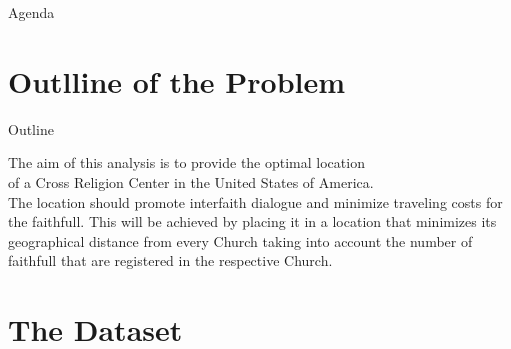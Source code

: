 \documentclass[12pt]{beamer}
\begin{document}
{
}
\begin{frame}{Agenda}
\tableofcontents
\end{frame}

\section{Outlline of the Problem}

\begin{frame}{Outline}

The aim of this analysis is to provide the optimal location \\
of a Cross Religion Center in the United States of America. \\
The location should promote interfaith dialogue and minimize traveling costs for the faithfull. 
This will be achieved by placing it in a location that minimizes its geographical distance from every Church taking into account the number of faithfull that are registered in the respective Church.



\end{frame}



\section{The Dataset}
\end{document}
